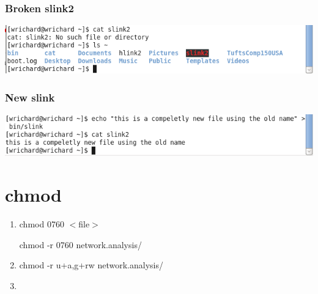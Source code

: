 \documentclass[a4paper,10pt]{article}
\begin{document}
\subsubsection{Broken slink2}
  \begin{center}
  \includegraphics[width=\linewidth]{./broken_slink2.png}
  \end{center}

\subsubsection{New slink}
  \begin{center}
  \includegraphics[width=\linewidth]{./new_slink.png}
  \end{center}

\section{chmod}
\begin{enumerate}
 \item chmod 0760 $<$file$>$

chmod -r 0760 network.analysis/
  \item chmod -r u+a,g+rw network.analysis/
  \item 
\end{enumerate}
\end{document}

